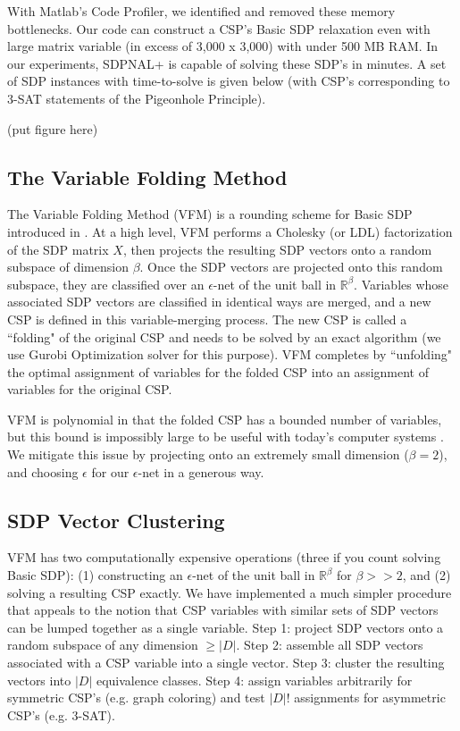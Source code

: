 \documentclass[11pt]{article} %
\begin{document}
With Matlab's Code Profiler, we identified and removed these memory bottlenecks. Our code can construct a CSP's Basic SDP relaxation even with large matrix variable (in excess of 3,000 x 3,000) with under 500 MB RAM. In our experiments, SDPNAL+ is capable of solving these SDP's in minutes. A set of SDP instances with time-to-solve is given below (with CSP's corresponding to 3-SAT statements of the Pigeonhole Principle).

(put figure here)

\subsection{The Variable Folding Method}

The Variable Folding Method (VFM) is a rounding scheme for Basic SDP introduced in \citet{raghavendra2009round}. At a high level, VFM performs a Cholesky (or LDL) factorization of the SDP matrix $X$, then projects the resulting SDP vectors onto a random subspace of dimension $\beta$. Once the SDP vectors are projected onto this random subspace, they are classified over an $\epsilon$-net of the unit ball in $\mathbb{R}^\beta$. Variables whose associated SDP vectors are classified in identical ways are merged, and a new CSP is defined in this variable-merging process. The new CSP is called a ``folding" of the original CSP and needs to be solved by an exact algorithm (we use Gurobi Optimization solver for this purpose). VFM completes by ``unfolding" the optimal assignment of variables for the folded CSP into an assignment of variables for the original CSP.

VFM is polynomial in that the folded CSP has a bounded number of variables, but this bound is impossibly large to be useful with today's computer systems \citep{qwivedi2015introduction}. We mitigate this issue by projecting onto an extremely small dimension ($\beta = 2$), and choosing $\epsilon$ for our $\epsilon$-net in a generous way.

\subsection{SDP Vector Clustering}

VFM has two computationally expensive operations (three if you count solving Basic SDP): (1) constructing an $\epsilon$-net of the unit ball in $\mathbb{R}^\beta$ for $\beta>>2$, and (2) solving a resulting CSP exactly. We have implemented a much simpler procedure that appeals to the notion that CSP variables with similar sets of SDP vectors can be lumped together as a single variable. Step 1: project SDP vectors onto a random subspace of any dimension $\geq |D|$. Step 2: assemble all SDP vectors associated with a CSP variable into a single vector. Step 3: cluster the resulting vectors into $|D|$ equivalence classes. Step 4: assign variables arbitrarily for symmetric CSP's (e.g. graph coloring) and test $|D|!$ assignments for asymmetric CSP's (e.g. 3-SAT).
\end{document}

